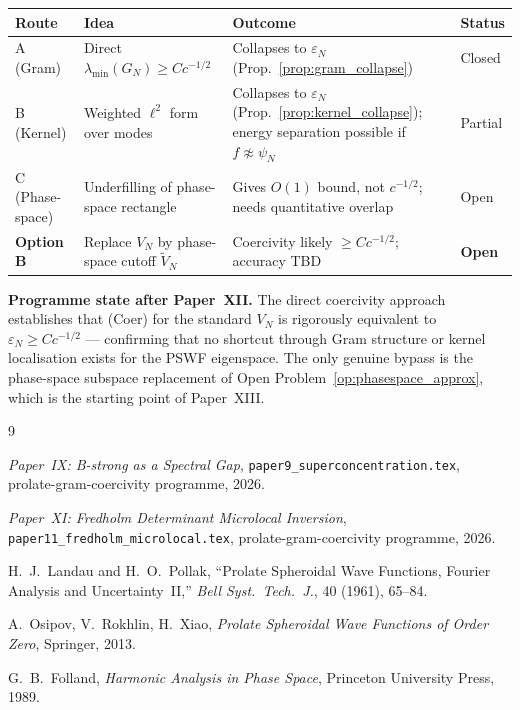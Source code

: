 \documentclass[12pt,a4paper]{article}
\newcommand{\VN}{V_N}
\begin{document}
\begin{center}
\renewcommand{\arraystretch}{1.5}
\begin{tabular}{p{2.2cm} p{4.5cm} p{4.5cm} p{1.5cm}}
\toprule
\textbf{Route} & \textbf{Idea} & \textbf{Outcome} & \textbf{Status} \\
\midrule
A (Gram) &
  Direct $\lambda_{\min}(G_N) \geq Cc^{-1/2}$ &
  Collapses to $\varepsilon_N$ (Prop.~\ref{prop:gram_collapse}) &
  Closed \\
B (Kernel) &
  Weighted $\ell^2$ form over modes &
  Collapses to $\varepsilon_N$ (Prop.~\ref{prop:kernel_collapse});
  energy separation possible if $f \not\approx \psi_N$ &
  Partial \\
C (Phase-space) &
  Underfilling of phase-space rectangle &
  Gives $O(1)$ bound, not $c^{-1/2}$; needs quantitative overlap &
  Open \\
\midrule
\textbf{Option B} &
  Replace $V_N$ by phase-space cutoff $\widetilde{V}_N$ &
  Coercivity likely $\geq Cc^{-1/2}$; accuracy TBD &
  \textbf{Open} \\
\bottomrule
\end{tabular}
\end{center}

\medskip\noindent
\textbf{Programme state after Paper~XII.}
The direct coercivity approach establishes that
(Coer) for the standard $\VN$ is rigorously
equivalent to $\varepsilon_N \geq Cc^{-1/2}$
--- confirming that no shortcut through
Gram structure or kernel localisation exists
for the PSWF eigenspace.
The only genuine bypass is the phase-space
subspace replacement of Open Problem~\ref{op:phasespace_approx},
which is the starting point of Paper~XIII.

\begin{thebibliography}{9}

  \textit{Paper~IX: B-strong as a Spectral Gap},
  \texttt{paper9\_superconcentration.tex},
  prolate-gram-coercivity programme, 2026.

  \textit{Paper~XI: Fredholm Determinant Microlocal Inversion},
  \texttt{paper11\_fredholm\_microlocal.tex},
  prolate-gram-coercivity programme, 2026.

  H.~J.~Landau and H.~O.~Pollak,
  ``Prolate Spheroidal Wave Functions,
  Fourier Analysis and Uncertainty~II,''
  \textit{Bell Syst.\ Tech.\ J.}, 40 (1961), 65--84.

  A.~Osipov, V.~Rokhlin, H.~Xiao,
  \textit{Prolate Spheroidal Wave Functions of Order Zero},
  Springer, 2013.

  G.~B.~Folland,
  \textit{Harmonic Analysis in Phase Space},
  Princeton University Press, 1989.

\end{thebibliography}
\end{document}
